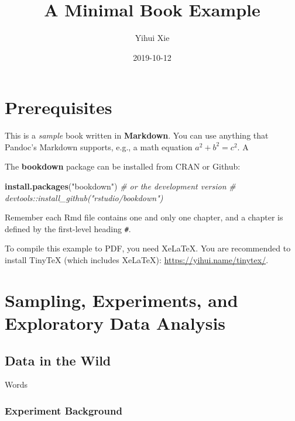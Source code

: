 \documentclass[]{book}
\title{A Minimal Book Example}
\author{Yihui Xie}
\date{2019-10-12}
\newenvironment{Shaded}{\begin{snugshade}}{\end{snugshade}}
\newcommand{\CommentTok}[1]{\textcolor[rgb]{0.56,0.35,0.01}{\textit{#1}}}
\newcommand{\KeywordTok}[1]{\textcolor[rgb]{0.13,0.29,0.53}{\textbf{#1}}}
\newcommand{\NormalTok}[1]{#1}
\newcommand{\StringTok}[1]{\textcolor[rgb]{0.31,0.60,0.02}{#1}}
\begin{document}
\maketitle

{
\setcounter{tocdepth}{1}
\tableofcontents
}
\hypertarget{prerequisites}{%
\chapter{Prerequisites}\label{prerequisites}}

This is a \emph{sample} book written in \textbf{Markdown}. You can use anything that Pandoc's Markdown supports, e.g., a math equation \(a^2 + b^2 = c^2\). A

The \textbf{bookdown} package can be installed from CRAN or Github:

\begin{Shaded}
\begin{Highlighting}[]
\KeywordTok{install.packages}\NormalTok{(}\StringTok{"bookdown"}\NormalTok{)}
\CommentTok{# or the development version}
\CommentTok{# devtools::install_github("rstudio/bookdown")}
\end{Highlighting}
\end{Shaded}

Remember each Rmd file contains one and only one chapter, and a chapter is defined by the first-level heading \texttt{\#}.

To compile this example to PDF, you need XeLaTeX. You are recommended to install TinyTeX (which includes XeLaTeX): \url{https://yihui.name/tinytex/}.

\hypertarget{sampling-experiments-and-exploratory-data-analysis}{%
\chapter{Sampling, Experiments, and Exploratory Data Analysis}\label{sampling-experiments-and-exploratory-data-analysis}}

\hypertarget{data-in-the-wild}{%
\section{Data in the Wild}\label{data-in-the-wild}}

Words

\hypertarget{experiment-background}{%
\subsection{Experiment Background}\label{experiment-background}}
\end{document}
